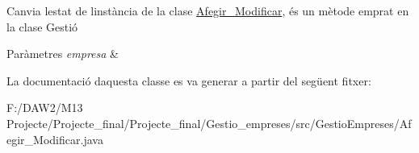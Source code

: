 Canvia l\textquotesingle{}estat de l\textquotesingle{}instància de la clase \mbox{\hyperlink{class_gestio_empreses_1_1_afegir___modificar}{Afegir\+\_\+\+Modificar}}, és un mètode emprat en la clase Gestió 
\begin{DoxyParams}{Paràmetres}
{\em empresa} & \\
\hline
\end{DoxyParams}


La documentació d\textquotesingle{}aquesta classe es va generar a partir del següent fitxer\+:\begin{DoxyCompactItemize}
\item 
F\+:/\+D\+A\+W2/\+M13 Projecte/\+Projecte\+\_\+final/\+Projecte\+\_\+final/\+Gestio\+\_\+empreses/src/\+Gestio\+Empreses/Afegir\+\_\+\+Modificar.\+java\end{DoxyCompactItemize}
